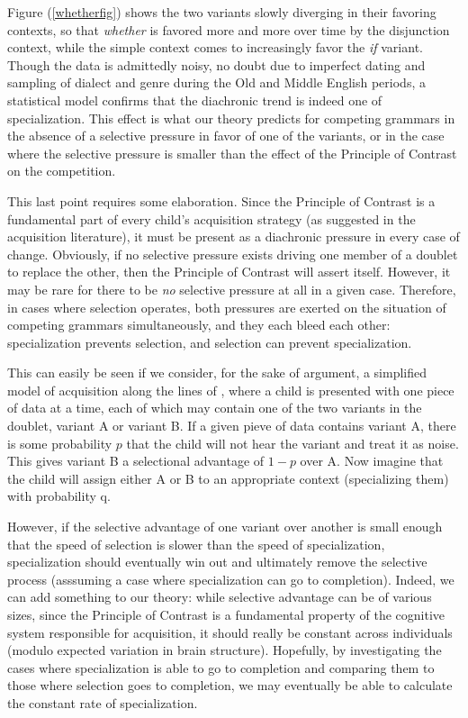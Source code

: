Figure (\ref{whetherfig}) shows the two variants slowly diverging in their favoring contexts, so that \textsl{whether} is favored more and more over time by the disjunction context, while the simple context comes to increasingly favor the \textsl{if} variant.
Though the data is admittedly noisy, no doubt due to imperfect dating and sampling of dialect and genre during the Old and Middle English periods, a statistical model confirms that the diachronic trend is indeed one of specialization. 
This effect is what our theory predicts for competing grammars in the absence of a selective pressure in favor of one of the variants, or in the case where the selective pressure is smaller than the effect of the Principle of Contrast on the competition.

This last point requires some elaboration.
Since the Principle of Contrast is a fundamental part of every child's acquisition strategy (as suggested in the acquisition literature), it must be present as a diachronic pressure in every case of change.
Obviously, if no selective pressure exists driving one member of a doublet to replace the other, then the Principle of Contrast will assert itself.
However, it may be rare for there to be \textsl{no} selective pressure at all in a given case.
Therefore, in cases where selection operates, both pressures are exerted on the situation of competing grammars simultaneously, and they each bleed each other: specialization prevents selection, and selection can prevent specialization.

This can easily be seen if we consider, for the sake of argument, a simplified model of acquisition along the lines of \citet{yang2000,yang2002}, where a child is presented with one piece of data at a time, each of which may contain one of the two variants in the doublet, variant A or variant B.
If a given pieve of data contains variant A, there is some probability $p$ that the child will not hear the variant and treat it as noise.
This gives variant B a selectional advantage of $1-p$ over A.
Now imagine that the child will assign either A or B to an appropriate context (specializing them) with probability q.


However, if the selective advantage of one variant over another is small enough that the speed of selection is slower than the speed of specialization, specialization should eventually win out and ultimately remove the selective process (asssuming a case where specialization can go to completion).
Indeed, we can add something to our theory: while selective advantage can be of various sizes, since the Principle of Contrast is a fundamental property of the cognitive system responsible for acquisition, it should really be constant across individuals (modulo expected variation in brain structure).
Hopefully, by investigating the cases where specialization is able to go to completion and comparing them to those where selection goes to completion, we may eventually be able to calculate the constant rate of specialization.

